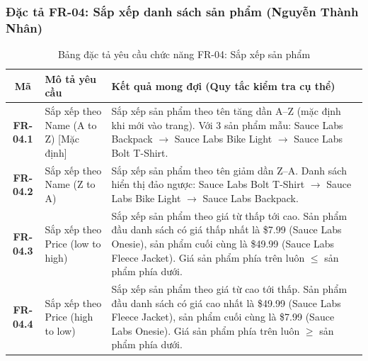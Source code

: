 \documentclass[a4paper]{article}
\begin{document}
\subsubsection{Đặc tả FR-04: Sắp xếp danh sách sản phẩm (Nguyễn Thành Nhân)}
\begin{table}[H]
\centering
\small
\begin{tabularx}{\textwidth}{|c|p{4.5cm}|X|}
\hline
\textbf{Mã} & \textbf{Mô tả yêu cầu} & \textbf{Kết quả mong đợi (Quy tắc kiểm tra cụ thể)} \\ \hline
\textbf{FR-04.1} & Sắp xếp theo Name (A to Z) [Mặc định] & Sắp xếp sản phẩm theo tên tăng dần A--Z (mặc định khi mới vào trang). Với 3 sản phẩm mẫu: Sauce Labs Backpack $\rightarrow$ Sauce Labs Bike Light $\rightarrow$ Sauce Labs Bolt T-Shirt. \\ \hline
\textbf{FR-04.2} & Sắp xếp theo Name (Z to A) & Sắp xếp sản phẩm theo tên giảm dần Z--A. Danh sách hiển thị đảo ngược: Sauce Labs Bolt T-Shirt $\rightarrow$ Sauce Labs Bike Light $\rightarrow$ Sauce Labs Backpack. \\ \hline
\textbf{FR-04.3} & Sắp xếp theo Price (low to high) & Sắp xếp sản phẩm theo giá từ thấp tới cao. Sản phẩm đầu danh sách có giá thấp nhất là \$7.99 (Sauce Labs Onesie), sản phẩm cuối cùng là \$49.99 (Sauce Labs Fleece Jacket). Giá sản phẩm phía trên luôn $\le$ sản phẩm phía dưới. \\ \hline
\textbf{FR-04.4} & Sắp xếp theo Price (high to low) & Sắp xếp sản phẩm theo giá từ cao tới thấp. Sản phẩm đầu danh sách có giá cao nhất là \$49.99 (Sauce Labs Fleece Jacket), sản phẩm cuối cùng là \$7.99 (Sauce Labs Onesie). Giá sản phẩm phía trên luôn $\ge$ sản phẩm phía dưới. \\ \hline
\end{tabularx}
\caption{Bảng đặc tả yêu cầu chức năng FR-04: Sắp xếp sản phẩm}
\end{table}
\end{document}
